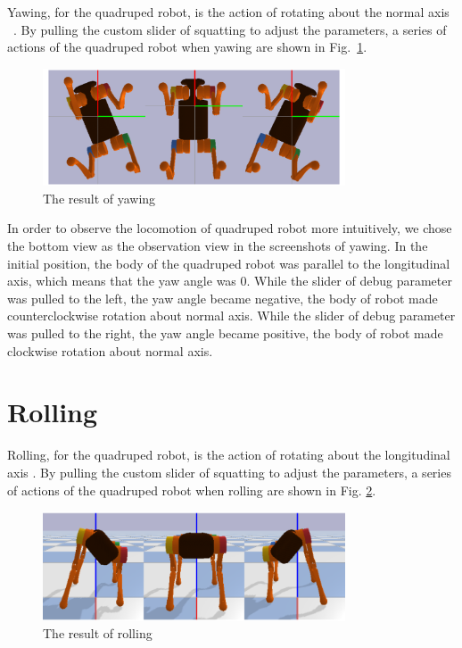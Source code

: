Yawing, for the quadruped robot, is the action of rotating about the normal axis ~\cite{ref:sixDOF}. By pulling the custom slider of squatting to adjust the parameters, a series of actions of the quadruped robot when yawing are shown in Fig.~\ref{fig:yawing}.

\begin{figure}[htbp]
    \centering
    \includegraphics[width=0.8\textwidth]{figures/yawing.png}
    \caption{The result of yawing}
    \label{fig:yawing}
\end{figure}


In order to observe the locomotion of quadruped robot more intuitively, we chose the bottom view as the observation view in the screenshots of yawing. In the initial position, the body of the quadruped robot was parallel to the longitudinal axis, which means that the yaw angle was 0. While the slider of debug parameter was pulled to the left, the yaw angle became negative, the body of robot made counterclockwise rotation about normal axis. While the slider of debug parameter was pulled to the right, the yaw angle became positive, the body of robot made clockwise rotation about normal axis.


\section{Rolling}

Rolling, for the quadruped robot, is the action of rotating about the longitudinal axis \cite{ref:sixDOF}. By pulling the custom slider of squatting to adjust the parameters, a series of actions of the quadruped robot when rolling are shown in Fig. \ref{fig:rolling}.

\begin{figure}[htbp]
    \centering
    \includegraphics[width=0.8\textwidth]{figures/rolling.png}
    \caption{The result of rolling}
    \label{fig:rolling}
\end{figure}

